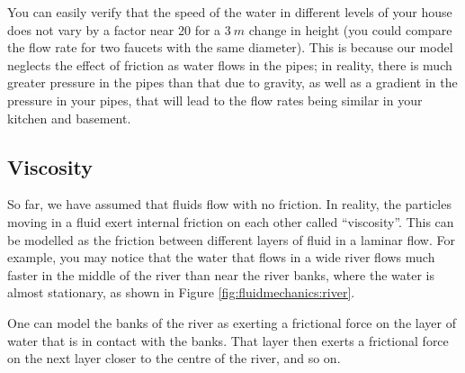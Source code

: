 {{\begin{example}
You can easily verify that the speed of the water in different levels of your house does not vary by a factor near 20 for a $\SI{3}{m}$ change in height (you could compare the flow rate for two faucets with the same diameter). This is because our model neglects the effect of friction as water flows in the pipes; in reality, there is much greater pressure in the pipes than that due to gravity, as well as a gradient in the pressure in your pipes, that will lead to the flow rates being similar in your kitchen and basement.
\end{example}

\subsection{Viscosity}
So far, we have assumed that fluids flow with no friction. In reality, the particles moving in  a fluid exert internal friction on each other called ``viscosity''. This can be modelled as the friction between different layers of fluid in a laminar flow. For example, you may notice that the water that flows in a wide river flows much faster in the middle of the river than near the river banks, where the water is almost stationary, as shown in Figure \ref{fig:fluidmechanics:river}. 

One can model the banks of the river as exerting a frictional force on the layer of water that is in contact with the banks. That layer then exerts a frictional force on the next layer closer to the centre of the river, and so on. 

}}
